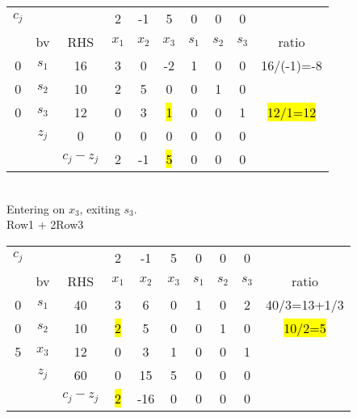 \documentclass[answers]{exam}
\begin{document}
\begin{tabular}{cccccccccc}
	$c_j$                  &                            &                                & 2     & -1    & 5     & 0     & 0     & 0     &            \\
	\multicolumn{1}{c|}{}  & \multicolumn{1}{c|}{bv}    & \multicolumn{1}{c|}{RHS}       & $x_1$ & $x_2$ & $x_3$ & $s_1$ & $s_2$ & $s_3$ & ratio      \\ \cline{1-9}
	\multicolumn{1}{c|}{0} & \multicolumn{1}{c|}{$s_1$} & \multicolumn{1}{c|}{16}        & 3     & 0     & -2    & 1     & 0     & 0     & 16/(-1)=-8 \\
	\multicolumn{1}{c|}{0} & \multicolumn{1}{c|}{$s_2$} & \multicolumn{1}{c|}{10}        & 2     & 5     & 0     & 0     & 1     & 0     &            \\
	\multicolumn{1}{c|}{0} & \multicolumn{1}{c|}{$s_3$} & \multicolumn{1}{c|}{12}        & 0     & 3     & \hl{1}     & 0     & 0     & 1     & \hl{12/1=12}    \\ \cline{1-9}
	& \multicolumn{1}{c|}{$z_j$} & \multicolumn{1}{c|}{0}         & 0     & 0     & 0     & 0     & 0     & 0     &            \\ \cline{3-9}
	&                            & \multicolumn{1}{c|}{$c_j-z_j$} & 2     & -1    & \hl{5}     & 0     & 0     & 0     &           
\end{tabular} \\

\noindent
Entering on $x_3$, exiting $s_3$. \\
Row1 + 2Row3 \\

\begin{tabular}{cccccccccc}
	$c_j$                  &                            &                                & 2     & -1    & 5     & 0     & 0     & 0     &             \\
	\multicolumn{1}{c|}{}  & \multicolumn{1}{c|}{bv}    & \multicolumn{1}{c|}{RHS}       & $x_1$ & $x_2$ & $x_3$ & $s_1$ & $s_2$ & $s_3$ & ratio       \\ \cline{1-9}
	\multicolumn{1}{c|}{0} & \multicolumn{1}{c|}{$s_1$} & \multicolumn{1}{c|}{40}        & 3     & 6     & 0     & 1     & 0     & 2     & 40/3=13+1/3 \\
	\multicolumn{1}{c|}{0} & \multicolumn{1}{c|}{$s_2$} & \multicolumn{1}{c|}{10}        & \hl{2}     & 5     & 0     & 0     & 1     & 0     & \hl{10/2=5}      \\
	\multicolumn{1}{c|}{5} & \multicolumn{1}{c|}{$x_3$} & \multicolumn{1}{c|}{12}        & 0     & 3     & 1     & 0     & 0     & 1     &             \\ \cline{1-9}
	& \multicolumn{1}{c|}{$z_j$} & \multicolumn{1}{c|}{60}        & 0     & 15    & 5     & 0     & 0     & 0     &             \\ \cline{3-9}
	&                            & \multicolumn{1}{c|}{$c_j-z_j$} & \hl{2}     & -16   & 0     & 0     & 0     & 0     &            
\end{tabular}\\
\end{document}
